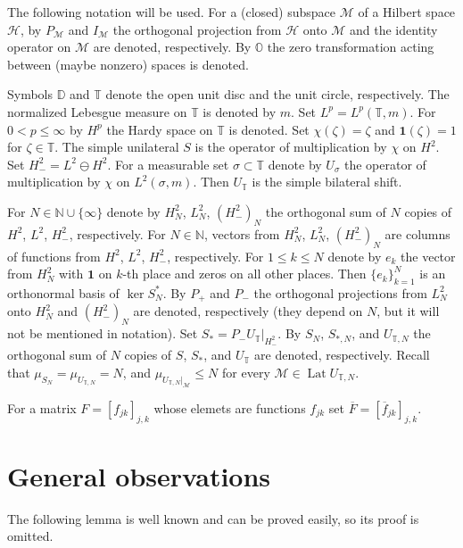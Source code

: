 \documentclass[a4paper,oneside,11pt]{amsart}
\numberwithin{equation}{section}
\theoremstyle{plain}
\theoremstyle{definition}
\begin{document}
The following notation will be used. For a (closed) subspace $\mathcal M$ of a Hilbert space $\mathcal H$, by 
$P_{\mathcal M}$ and $I_{\mathcal M}$ the orthogonal projection from $\mathcal H$ onto $\mathcal M$ and 
 the identity operator on $\mathcal M$ are denoted,  respectively. By $\mathbb O$ the zero transformation acting between (maybe nonzero) spaces is denoted.

Symbols $\mathbb D$ and $\mathbb T$ denote the open unit disc
and the unit circle, respectively. The normalized Lebesgue measure on $\mathbb T$ is denoted by $m$. 
Set $L^p=L^p(\mathbb T,m)$. For $0<p\leq\infty$ by $H^p$ the Hardy space on $\mathbb T$ is denoted. Set $\chi(\zeta)=\zeta$ and $\mathbf{1}(\zeta)=1$ for $\zeta\in\mathbb T$. 
The simple unilateral  $S$ is the operator  of multiplication by $\chi$   on $H^2$.  Set $H^2_-=L^2\ominus H^2$. 
For a measurable set $\sigma\subset\mathbb T$ denote by $U_\sigma$ the operator of multiplication by $\chi$ on 
 $L^2(\sigma,m)$. Then $U_{\mathbb T}$ is the simple bilateral shift. 

For $N\in\mathbb N\cup\{\infty\}$ denote by  $H^2_N$, $L^2_N$, $(H^2_-)_N$   the orthogonal sum of $N$ copies of $H^2$, $L^2$, $H^2_-$, respectively. For $N\in\mathbb N$, vectors from $H^2_N$, $L^2_N$, $(H^2_-)_N$ are columns of functions from $H^2$, $L^2$, $H^2_-$, respectively. For $1\leq k\leq N$ denote by $e_k$ the vector from $H^2_N$ 
with $\mathbf{1}$ on $k$-th place and zeros on all other places.
Then $\{e_k\}_{k=1}^{N}$ is an orthonormal basis of $\ker S_N^*$. 
By $P_+$ and $P_-$ the orthogonal projections from $L^2_N$ onto $H^2_N$ and $(H^2_-)_N$  
are denoted, respectively (they depend on $N$, but it will not be mentioned in notation). 
Set $S_*=P_-U_{\mathbb T}|_{H^2_-}$. By $S_N$, $S_{*, N}$,  and $U_{\mathbb T, N}$
 the orthogonal sum of $N$ copies of $S$, $S_*$, and $U_{\mathbb T}$ are denoted,  respectively. 
Recall that $\mu_{S_N}=\mu_{U_{\mathbb T, N}}=N$, and $\mu_{U_{\mathbb T, N}|_{\mathcal M}}\leq N$ for every 
$\mathcal M\in\operatorname{Lat}U_{\mathbb T, N}$.

For a matrix 
$F=[f_{jk}]_{j,k}$ whose elemets are functions $f_{jk}$ set  $\overline F=[\overline f_{jk}]_{j,k}$. 




\section{General observations}


The following lemma is well known and can be proved easily, so its proof is omitted. 
\end{document}
